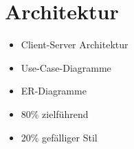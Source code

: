\chapter{Architektur}
\label{cha:architektur}

\begin{itemize}
\item Client-Server Architektur
\item Use-Case-Diagramme
\item ER-Diagramme
\end{itemize}

\begin{itemize}
\item 80\% zielführend
\item 20\% gefälliger Stil
\end{itemize}